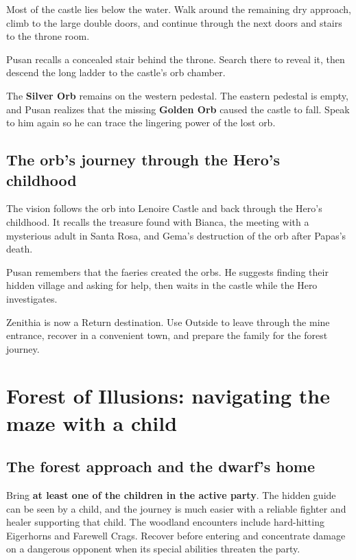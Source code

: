 Most of the castle lies below the water. Walk around the remaining
dry approach, climb to the large double doors, and continue
through the next doors and stairs to the throne room.

Pusan recalls a concealed stair behind the throne. Search there
to reveal it, then descend the long ladder to the castle's
orb chamber.

The \textbf{Silver Orb} remains on the western pedestal.
The eastern pedestal is empty, and Pusan realizes that the
missing \textbf{Golden Orb} caused the castle to fall. Speak
to him again so he can trace the lingering power of the lost orb.

\subsection*{The orb's journey through the Hero's childhood}

The vision follows the orb into Lenoire Castle and back through
the Hero's childhood. It recalls the treasure found with Bianca,
the meeting with a mysterious adult in Santa Rosa, and Gema's
destruction of the orb after Papas's death.

Pusan remembers that the faeries created the orbs. He suggests
finding their hidden village and asking for help, then waits
in the castle while the Hero investigates.


Zenithia is now a Return destination. Use Outside to leave
through the mine entrance, recover in a convenient town, and
prepare the family for the forest journey.

\section{Forest of Illusions: navigating the maze with a child}

\subsection*{The forest approach and the dwarf's home}

Bring \textbf{at least one of the children in the active party}.
The hidden guide can be seen by a child, and the journey is much
easier with a reliable fighter and healer supporting that child.
The woodland encounters include hard-hitting Eigerhorns and
Farewell Crags. Recover before entering and concentrate damage
on a dangerous opponent when its special abilities threaten
the party.

